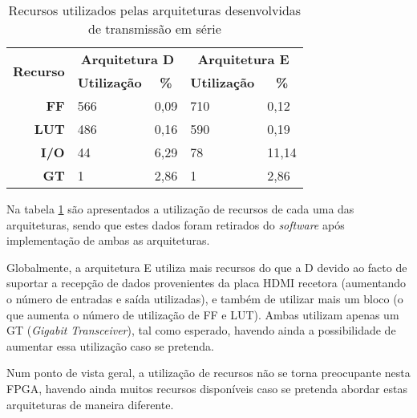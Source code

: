 \begin{table}[h!]
	\centering
	\caption{Recursos utilizados pelas arquiteturas desenvolvidas de transmissão em série}
	\label{table:recursos_planoD_planoE}

		\begin{tabular}{rllll}
			\hline
			\multicolumn{1}{c}{\multirow{2}{*}{\textbf{Recurso}}} & \multicolumn{2}{c}{\textbf{Arquitetura D}}                                 & \multicolumn{2}{c}{\textbf{Arquitetura E}}                               \\ \cline{2-5} 
			\multicolumn{1}{c}{}                                  & \multicolumn{1}{c}{\textbf{Utilização}} & \multicolumn{1}{c|}{\textbf{\%}} & \multicolumn{1}{c}{\textbf{Utilização}} & \multicolumn{1}{c}{\textbf{\%}} \\ \hline
			\multicolumn{1}{r|}{\textbf{FF}}                      & 566                                     & \multicolumn{1}{l|}{0,09}        & 710                                    & 0,12                            \\
			\multicolumn{1}{r|}{\textbf{LUT}}                     & 486                                     & \multicolumn{1}{l|}{0,16}        & 590                                    & 0,19                            \\
			\multicolumn{1}{r|}{\textbf{I/O}}                     & 44                                      & \multicolumn{1}{l|}{6,29}        & 78                                     & 11,14                           \\
			\multicolumn{1}{r|}{\textbf{GT}}                      & 1                                       & \multicolumn{1}{l|}{2,86}        & 1                                      & 2,86                            \\ \hline
		\end{tabular}%
\end{table}

Na tabela \ref{table:recursos_planoD_planoE} são apresentados a utilização de recursos de cada uma das arquiteturas, sendo que estes dados foram retirados do \textit{software} após implementação de ambas as arquiteturas.

Globalmente, a arquitetura E utiliza mais recursos do que a D devido ao facto de suportar a recepção de dados provenientes da placa HDMI recetora (aumentando o número de entradas e saída utilizadas), e também de utilizar mais um bloco (o que aumenta o número de utilização de FF e LUT). Ambas utilizam apenas um GT (\textit{Gigabit Transceiver}), tal como esperado, havendo ainda a possibilidade de aumentar essa utilização caso se pretenda.

Num ponto de vista geral, a utilização de recursos não se torna preocupante nesta FPGA, havendo ainda muitos recursos disponíveis caso se pretenda abordar estas arquiteturas de maneira diferente.